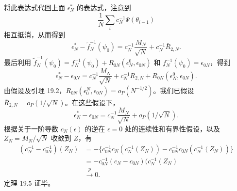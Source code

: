 将此表达式代回上面 $\epsilon_N^*$ 的表达式，注意到
\[
 \frac1N\sum_i c_N^{-1}\Psi(\theta_{i-1})
\]
相互抵消，从而得到
\[
 \epsilon_N^*-\tilde f_N^{-1}(\psi_0)
 =c_N^{-1}\frac{M_N}{\sqrt N}+c_N^{-1}\bar R_{2,N}.
\]
最后利用 $\tilde f_N^{-1}(\psi_0)=f_N^{-1}(\psi_0)+R_{0N}(\epsilon_N^0,\epsilon_{0N})$ 和 $f_N^{-1}(\psi_0)=\epsilon_{0N}$，得到
\[
 \epsilon_N^*-\epsilon_{0N}=c_N^{-1}\frac{M_N}{\sqrt N}
 +c_N^{-1}\bar R_{2,N}+R_{0N}(\epsilon_N^0,\epsilon_{0N}).
\]
由假设及引理 19.2，$R_{0N}(\epsilon_0^N,\epsilon_{0N})=o_P(N^{-1/2})$。我们已假设 $\bar R_{2,N}=o_P(1/\sqrt N)$。在这些假设下，
\[
 \epsilon_N^*-\epsilon_{0N}=c_N^{-1}\frac{M_N}{\sqrt N}+o_P(1/\sqrt N).
\]
根据关于一阶导数 $c_N(\epsilon)$ 的逆在 $\epsilon=0$ 处的连续性和有界性假设，以及 $Z_N=M_N/\sqrt N$ 收敛到 $Z$，有
\[
\begin{aligned}
 (c_N^{-1}-c_{0N}^{-1})(Z_N)
 &=-\{c_{0N}^{-1}c_N(c_N^{-1}(Z_N))
 -c_{0N}^{-1}c_{0N}(c_N^{-1}(Z_N))\}\\
 &=-c_{0N}^{-1}(c_N-c_{0N})(c_N^{-1}(Z_N)\\
 &\xrightarrow{p}0.
\end{aligned}
\]
定理 19.5 证毕。
